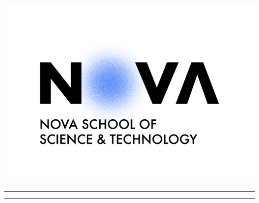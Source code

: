 \begin{center}\leavevmode                      %
    \normalfont
    \includegraphics[width=0.75\columnwidth]{img/logo.png}  %
    \vskip 1cm                                 %
    \textsc{\Large \departmento}\\[1 cm]       %
    {\large \curso}                            %
    \vskip 1cm                                 %
    \rule{\linewidth}{0.2 mm}                  %
    {\huge \bfseries \titulo \par}             %
    \vskip 1cm                                 %
    {\Large \bfseries \cadeira \par}          %
           
    \rule{\linewidth}{0.2 mm}\\[1.5 cm]        %
     

\end{center}
